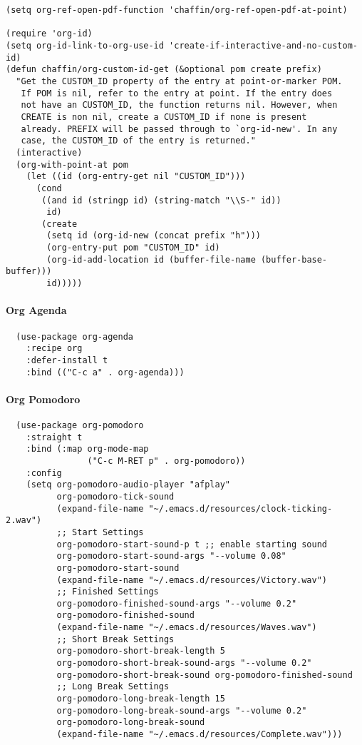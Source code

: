 \documentclass[11pt]{article}
\begin{document}
\begin{verbatim}
(setq org-ref-open-pdf-function 'chaffin/org-ref-open-pdf-at-point)

(require 'org-id)
(setq org-id-link-to-org-use-id 'create-if-interactive-and-no-custom-id)
(defun chaffin/org-custom-id-get (&optional pom create prefix)
  "Get the CUSTOM_ID property of the entry at point-or-marker POM.
   If POM is nil, refer to the entry at point. If the entry does
   not have an CUSTOM_ID, the function returns nil. However, when
   CREATE is non nil, create a CUSTOM_ID if none is present
   already. PREFIX will be passed through to `org-id-new'. In any
   case, the CUSTOM_ID of the entry is returned."
  (interactive)
  (org-with-point-at pom
    (let ((id (org-entry-get nil "CUSTOM_ID")))
      (cond
       ((and id (stringp id) (string-match "\\S-" id))
        id)
       (create
        (setq id (org-id-new (concat prefix "h")))
        (org-entry-put pom "CUSTOM_ID" id)
        (org-id-add-location id (buffer-file-name (buffer-base-buffer)))
        id)))))
\end{verbatim}

\paragraph*{Org Agenda}
\label{sec:org9a99710}

\begin{verbatim}
  (use-package org-agenda
    :recipe org
    :defer-install t
    :bind (("C-c a" . org-agenda)))
\end{verbatim}

\paragraph*{Org Pomodoro}
\label{sec:org98ba444}

\begin{verbatim}
  (use-package org-pomodoro
    :straight t
    :bind (:map org-mode-map
                ("C-c M-RET p" . org-pomodoro))
    :config
    (setq org-pomodoro-audio-player "afplay"
          org-pomodoro-tick-sound
          (expand-file-name "~/.emacs.d/resources/clock-ticking-2.wav")
          ;; Start Settings
          org-pomodoro-start-sound-p t ;; enable starting sound
          org-pomodoro-start-sound-args "--volume 0.08"
          org-pomodoro-start-sound
          (expand-file-name "~/.emacs.d/resources/Victory.wav")
          ;; Finished Settings
          org-pomodoro-finished-sound-args "--volume 0.2"
          org-pomodoro-finished-sound
          (expand-file-name "~/.emacs.d/resources/Waves.wav")
          ;; Short Break Settings
          org-pomodoro-short-break-length 5
          org-pomodoro-short-break-sound-args "--volume 0.2"
          org-pomodoro-short-break-sound org-pomodoro-finished-sound
          ;; Long Break Settings
          org-pomodoro-long-break-length 15
          org-pomodoro-long-break-sound-args "--volume 0.2"
          org-pomodoro-long-break-sound
          (expand-file-name "~/.emacs.d/resources/Complete.wav")))
\end{verbatim}
\end{document}
